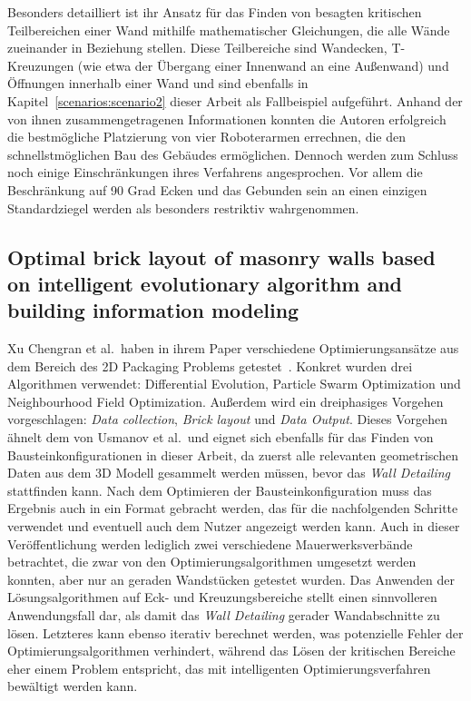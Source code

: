 Besonders detailliert ist ihr Ansatz für das Finden von besagten kritischen Teilbereichen einer Wand mithilfe mathematischer Gleichungen, die alle Wände zueinander in Beziehung stellen.
Diese Teilbereiche sind Wandecken, T-Kreuzungen (wie etwa der Übergang einer Innenwand an eine Außenwand) und Öffnungen innerhalb einer Wand und sind ebenfalls in Kapitel~\ref{scenarios:scenario2} dieser Arbeit als Fallbeispiel aufgeführt.
Anhand der von ihnen zusammengetragenen Informationen konnten die Autoren erfolgreich die bestmögliche Platzierung von vier Roboterarmen errechnen, die den schnellstmöglichen Bau des Gebäudes ermöglichen.
Dennoch werden zum Schluss noch einige Einschränkungen ihres Verfahrens angesprochen.
Vor allem die Beschränkung auf 90 Grad Ecken und das Gebunden sein an einen einzigen Standardziegel werden als besonders restriktiv wahrgenommen.

\subsection{Optimal brick layout of masonry walls based on intelligent evolutionary algorithm and building information modeling}
Xu Chengran et al.\ haben in ihrem Paper verschiedene Optimierungsansätze aus dem Bereich des 2D Packaging Problems getestet~\cite{Xu2021}.
Konkret wurden drei Algorithmen verwendet: Differential Evolution, Particle Swarm Optimization und Neighbourhood Field Optimization.
Außerdem wird ein dreiphasiges Vorgehen vorgeschlagen: \textit{Data collection}, \textit{Brick layout} und \textit{Data Output}.
Dieses Vorgehen ähnelt dem von Usmanov et al.\ und eignet sich ebenfalls für das Finden von Bausteinkonfigurationen in dieser Arbeit, da zuerst alle relevanten geometrischen Daten aus dem 3D Modell gesammelt werden müssen, bevor das \textit{Wall Detailing} stattfinden kann.
Nach dem Optimieren der Bausteinkonfiguration muss das Ergebnis auch in ein Format gebracht werden, das für die nachfolgenden Schritte verwendet und eventuell auch dem Nutzer angezeigt werden kann.
Auch in dieser Veröffentlichung werden lediglich zwei verschiedene Mauerwerksverbände betrachtet, die zwar von den Optimierungsalgorithmen umgesetzt werden konnten, aber nur an geraden Wandstücken getestet wurden.
Das Anwenden der Lösungsalgorithmen auf Eck- und Kreuzungsbereiche stellt einen sinnvolleren Anwendungsfall dar, als damit das \textit{Wall Detailing} gerader Wandabschnitte zu lösen.
Letzteres kann ebenso iterativ berechnet werden, was potenzielle Fehler der Optimierungsalgorithmen verhindert, während das Lösen der kritischen Bereiche eher einem Problem entspricht, das mit \glqq{}intelligenten\grqq{} Optimierungsverfahren bewältigt werden kann. 

